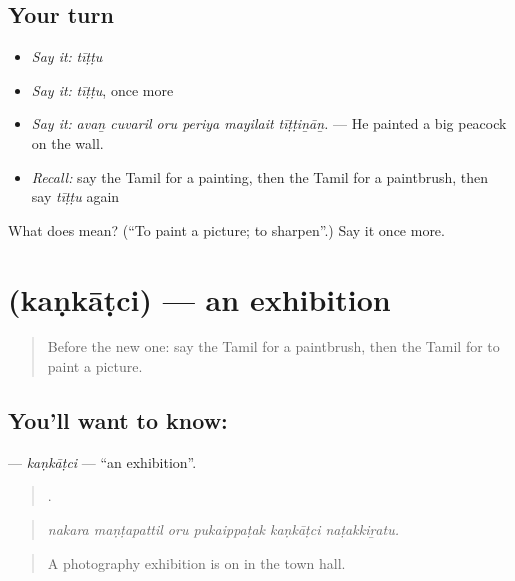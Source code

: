 \subsection*{Your turn}
\begin{itemize}
\raggedright
  \item \emph{Say it:} \emph{tīṭṭu}
  \item \emph{Say it:} \emph{tīṭṭu}, once more
  \item \emph{Say it:} \emph{avaṉ cuvaril oru periya mayilait tīṭṭiṉāṉ.} — He painted a big peacock on the wall.
  \item \emph{Recall:} say the Tamil for a painting, then the Tamil for a paintbrush, then say \emph{tīṭṭu} again
\end{itemize}

\begin{tcolorbox}[breakable,colback=teal!4,colframe=teal!35!black,title={Before you move on}]
What does  mean? (\textquotedblleft{}To paint a picture; to sharpen\textquotedblright{}.) Say it once more.
\end{tcolorbox}
\section[\texorpdfstring{\ta{கண்காட்சி} (kaṇkāṭci)}{கண்காட்சி (kaṇkāṭci)}]{ (kaṇkāṭci) — an exhibition}

\label{lesson:TA-C536-kankatci}



\begin{quote}
Before the new one: say the Tamil for a paintbrush, then the Tamil for to paint a picture.
\end{quote}

\subsection*{You'll want to know: }
\textbf{} — \emph{kaṇkāṭci} — \textquotedblleft{}an exhibition\textquotedblright{}.

\begin{quote}
     .
\end{quote}

\begin{quote}
\emph{nakara maṇṭapattil oru pukaippaṭak kaṇkāṭci naṭakkiṟatu.}
\end{quote}

\begin{quote}
A photography exhibition is on in the town hall.
\end{quote}

